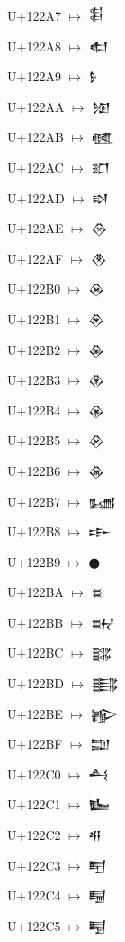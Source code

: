 {\noindent U+122A7  $\mapsto$ {\cufont 𒊧}\par
\noindent U+122A8  $\mapsto$ {\cufont 𒊨}\par
\noindent U+122A9  $\mapsto$ {\cufont 𒊩}\par
\noindent U+122AA  $\mapsto$ {\cufont 𒊪}\par
\noindent U+122AB  $\mapsto$ {\cufont 𒊫}\par
\noindent U+122AC  $\mapsto$ {\cufont 𒊬}\par
\noindent U+122AD  $\mapsto$ {\cufont 𒊭}\par
\noindent U+122AE  $\mapsto$ {\cufont 𒊮}\par
\noindent U+122AF  $\mapsto$ {\cufont 𒊯}\par
\noindent U+122B0  $\mapsto$ {\cufont 𒊰}\par
\noindent U+122B1  $\mapsto$ {\cufont 𒊱}\par
\noindent U+122B2  $\mapsto$ {\cufont 𒊲}\par
\noindent U+122B3  $\mapsto$ {\cufont 𒊳}\par
\noindent U+122B4  $\mapsto$ {\cufont 𒊴}\par
\noindent U+122B5  $\mapsto$ {\cufont 𒊵}\par
\noindent U+122B6  $\mapsto$ {\cufont 𒊶}\par
\noindent U+122B7  $\mapsto$ {\cufont 𒊷}\par
\noindent U+122B8  $\mapsto$ {\cufont 𒊸}\par
\noindent U+122B9  $\mapsto$ {\cufont 𒊹}\par
\noindent U+122BA  $\mapsto$ {\cufont 𒊺}\par
\noindent U+122BB  $\mapsto$ {\cufont 𒊻}\par
\noindent U+122BC  $\mapsto$ {\cufont 𒊼}\par
\noindent U+122BD  $\mapsto$ {\cufont 𒊽}\par
\noindent U+122BE  $\mapsto$ {\cufont 𒊾}\par
\noindent U+122BF  $\mapsto$ {\cufont 𒊿}\par
\noindent U+122C0  $\mapsto$ {\cufont 𒋀}\par
\noindent U+122C1  $\mapsto$ {\cufont 𒋁}\par
\noindent U+122C2  $\mapsto$ {\cufont 𒋂}\par
\noindent U+122C3  $\mapsto$ {\cufont 𒋃}\par
\noindent U+122C4  $\mapsto$ {\cufont 𒋄}\par
\noindent U+122C5  $\mapsto$ {\cufont 𒋅}\par
}
